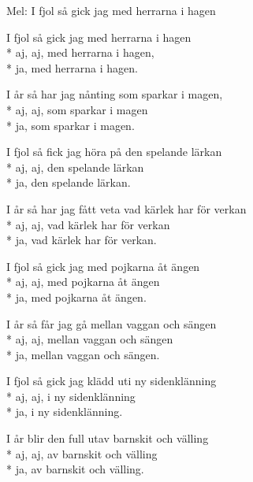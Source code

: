 \begin{SongText}
    \begin{SongInfo}
        Mel: I fjol så gick jag med herrarna i hagen
    \end{SongInfo}
    \begin{SongVerse}
        I fjol så gick jag med herrarna i hagen\\*%
        aj, aj, med herrarna i hagen,\\*%
        ja, med herrarna i hagen.
    \end{SongVerse}
    \begin{SongVerse}
        I år så har jag nånting som sparkar i magen,\\*%
        aj, aj, som sparkar i magen\\*%
        ja, som sparkar i magen.
    \end{SongVerse}
    \begin{SongVerse}
        I fjol så fick jag höra på den spelande lärkan\\*%
        aj, aj, den spelande lärkan\\*%
        ja, den spelande lärkan.
    \end{SongVerse}
    \begin{SongVerse}
        I år så har jag fått veta vad kärlek har för verkan\\*%
        aj, aj, vad kärlek har för verkan\\*%
        ja, vad kärlek har för verkan.
    \end{SongVerse}
    \begin{SongVerse}
        I fjol så gick jag med pojkarna åt ängen\\*%
        aj, aj, med pojkarna åt ängen\\*%
        ja, med pojkarna åt ängen.
    \end{SongVerse}
    \begin{SongVerse}
        I år så får jag gå mellan vaggan och sängen\\*%
        aj, aj, mellan vaggan och sängen\\*%
        ja, mellan vaggan och sängen.
    \end{SongVerse}
    \begin{SongVerse}
        I fjol så gick jag klädd uti ny sidenklänning\\*%
        aj, aj, i ny sidenklänning\\*%
        ja, i ny sidenklänning.
    \end{SongVerse}
    \begin{SongVerse}
        I år blir den full utav barnskit och välling\\*%
        aj, aj, av barnskit och välling\\*%
        ja, av barnskit och välling.
    \end{SongVerse}
\end{SongText}
